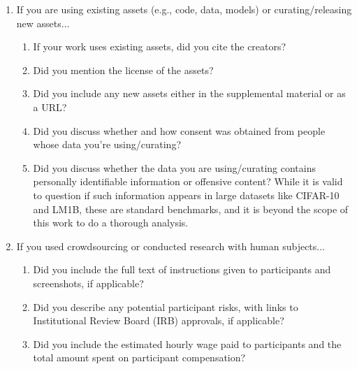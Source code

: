 \begin{enumerate}
\item If you are using existing assets (e.g., code, data, models) or curating/releasing new assets...
\begin{enumerate}
  \item If your work uses existing assets, did you cite the creators?
  \item Did you mention the license of the assets?
  \item Did you include any new assets either in the supplemental material or as a URL?
    \answerNo{}
  \item Did you discuss whether and how consent was obtained from people whose data you're using/curating?
    \answerNA{}
  \item Did you discuss whether the data you are using/curating contains personally identifiable information or offensive content?
    \answerNo{} While it is valid to question if such information appears in large datasets like CIFAR-10 and LM1B, these are standard benchmarks, and it is beyond the scope of this work to do a thorough analysis.
\end{enumerate}

\item If you used crowdsourcing or conducted research with human subjects...
\begin{enumerate}
  \item Did you include the full text of instructions given to participants and screenshots, if applicable?
    \answerNA{}
  \item Did you describe any potential participant risks, with links to Institutional Review Board (IRB) approvals, if applicable?
    \answerNA{}
  \item Did you include the estimated hourly wage paid to participants and the total amount spent on participant compensation?
    \answerNA{}
\end{enumerate}

\end{enumerate}
